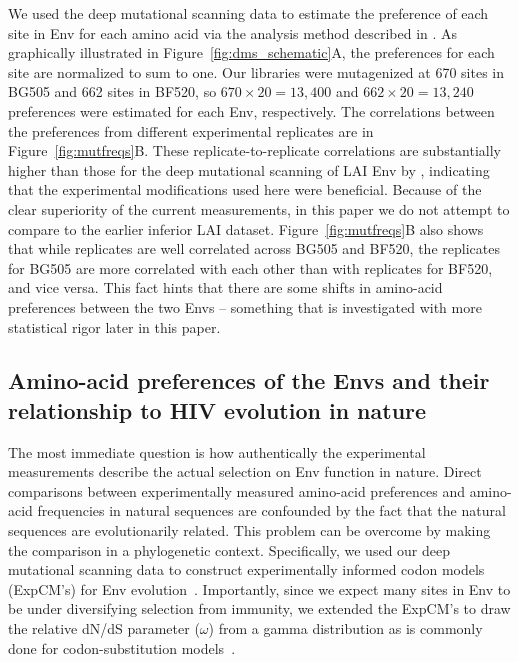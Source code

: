 \documentclass[9pt]{elife}
\begin{document}
We used the deep mutational scanning data to estimate the preference of each site in Env for each amino acid via the analysis method described in \citet{bloom2015software}.
As graphically illustrated in Figure~\ref{fig:dms_schematic}A, the preferences for each site are normalized to sum to one.
Our libraries were mutagenized at 670 sites in BG505 and 662 sites in BF520, so $670 \times 20 = 13,400$ and $662 \times 20 = 13,240$ preferences were estimated for each Env, respectively.
The correlations between the preferences from different experimental replicates are in Figure~\ref{fig:mutfreqs}B.
These replicate-to-replicate correlations are substantially higher than those for the deep mutational scanning of LAI Env by \citet{haddox2016experimental}, indicating that the experimental modifications used here were beneficial.
Because of the clear superiority of the current measurements, in this paper we do not attempt to compare to the earlier inferior LAI dataset. 
Figure~\ref{fig:mutfreqs}B also shows that while replicates are well correlated across BG505 and BF520, the replicates for BG505 are more correlated with each other than with replicates for BF520, and vice versa.
This fact hints that there are some shifts in amino-acid preferences between the two Envs -- something that is investigated with more statistical rigor later in this paper.

\subsection{Amino-acid preferences of the Envs and their relationship to HIV evolution in nature}
The most immediate question is how authentically the experimental measurements describe the actual selection on Env function in nature.
Direct comparisons between experimentally measured amino-acid preferences and amino-acid frequencies in natural sequences are confounded by the fact that the natural sequences are evolutionarily related.
This problem can be overcome by making the comparison in a phylogenetic context.
Specifically, we used our deep mutational scanning data to construct experimentally informed codon models (ExpCM's) for Env evolution~\citep{hilton2017phydms,bloom2017identification}.
Importantly, since we expect many sites in Env to be under diversifying selection from immunity, we extended the ExpCM's to draw the relative dN/dS parameter ($\omega$) from a gamma distribution as is commonly done for codon-substitution models~\citep{yang2000codon}.
\end{document}
